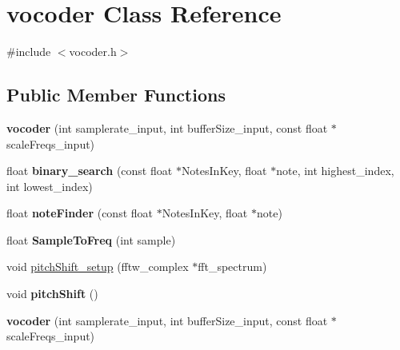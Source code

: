 \hypertarget{classvocoder}{\section{vocoder Class Reference}
\label{classvocoder}
}


{\ttfamily \#include $<$vocoder.\-h$>$}

\subsection*{Public Member Functions}
\begin{DoxyCompactItemize}
\item 
\hypertarget{classvocoder_a5e51f2bff73fdb41cb326e0743170b15}{{\bfseries vocoder} (int samplerate\-\_\-input, int buffer\-Size\-\_\-input, const float $\ast$scale\-Freqs\-\_\-input)}\label{classvocoder_a5e51f2bff73fdb41cb326e0743170b15}

\item 
\hypertarget{classvocoder_a516a5e099509664b6b328a9d055adcd7}{float {\bfseries binary\-\_\-search} (const float $\ast$Notes\-In\-Key, float $\ast$note, int highest\-\_\-index, int lowest\-\_\-index)}\label{classvocoder_a516a5e099509664b6b328a9d055adcd7}

\item 
\hypertarget{classvocoder_ac1c52677bdf6c7233f667c3905539716}{float {\bfseries note\-Finder} (const float $\ast$Notes\-In\-Key, float $\ast$note)}\label{classvocoder_ac1c52677bdf6c7233f667c3905539716}

\item 
\hypertarget{classvocoder_a2b3a6e386d3a18f9366320e5743d33b1}{float {\bfseries Sample\-To\-Freq} (int sample)}\label{classvocoder_a2b3a6e386d3a18f9366320e5743d33b1}

\item 
void \hyperlink{classvocoder_aa3d122aee6d6ae77ac5b04572e924dc0}{pitch\-Shift\-\_\-setup} (fftw\-\_\-complex $\ast$fft\-\_\-spectrum)
\item 
\hypertarget{classvocoder_aa218678a51da7429066c32e59edd5057}{void {\bfseries pitch\-Shift} ()}\label{classvocoder_aa218678a51da7429066c32e59edd5057}

\item 
\hypertarget{classvocoder_a5e51f2bff73fdb41cb326e0743170b15}{{\bfseries vocoder} (int samplerate\-\_\-input, int buffer\-Size\-\_\-input, const float $\ast$scale\-Freqs\-\_\-input)}\label{classvocoder_a5e51f2bff73fdb41cb326e0743170b15}


\end{DoxyCompactItemize}

